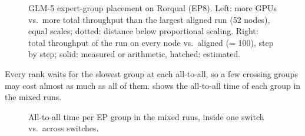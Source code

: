 \begin{figure}[h]
  \centering{}
  \caption{GLM-5 expert-group placement on Rorqual (EP8). Left: more GPUs vs.\ more total throughput than
    the largest aligned run (52 nodes), equal scales; dotted: distance below proportional scaling. Right:
    total throughput of the run on every node vs.\ aligned (= 100), step by step; solid: measured or
    arithmetic, hatched: estimated. }
  \label{fig:expert-placement}
\end{figure}

Every rank waits for the slowest group at each all-to-all, so a few crossing groups may cost almost as
much as all of them.  shows the all-to-all time of each group in the mixed runs.

\begin{figure}[h]
  \centering{}
  \caption{All-to-all time per EP group in the mixed runs, inside one switch vs.\ across switches.
    }
  \label{fig:expert-groups}
\end{figure}


